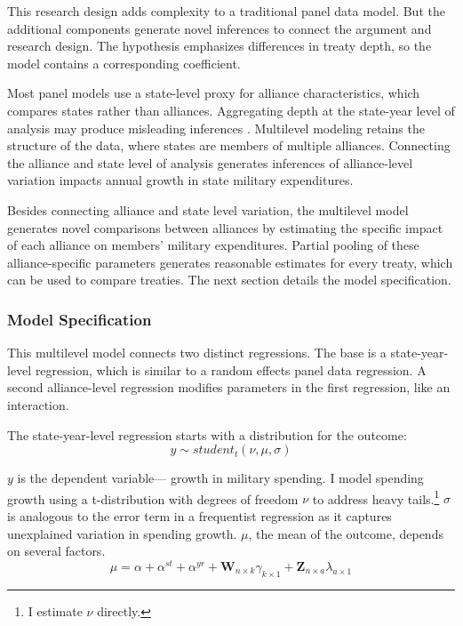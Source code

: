\documentclass[12pt]{article}
\begin{document}
This research design adds complexity to a traditional panel data model. 
But the additional components generate novel inferences to connect the argument and research design. 
The hypothesis emphasizes differences in treaty depth, so the model contains a corresponding coefficient.


Most panel models use a state-level proxy for alliance characteristics, which compares states rather than alliances.
Aggregating depth at the state-year level of analysis may produce misleading inferences \citep{McElreath2016}.
Multilevel modeling retains the structure of the data, where states are members of multiple alliances. 
Connecting the alliance and state level of analysis generates inferences of alliance-level variation impacts annual growth in state military expenditures. 


Besides connecting alliance and state level variation, the multilevel model generates novel comparisons between alliances by estimating the specific impact of each alliance on members' military expenditures. 
Partial pooling of these alliance-specific parameters generates reasonable estimates for every treaty, which can be used to compare treaties. 
The next section details the model specification. 
 


\subsubsection{Model Specification} 

This multilevel model connects two distinct regressions. 
The base is a state-year-level regression, which is similar to a random effects panel data regression.
A second alliance-level regression modifies parameters in the first regression, like an interaction. 


The state-year-level regression starts with a distribution for the outcome:
\begin{equation}
y \sim student_t(\nu, \mu, \sigma)
\end{equation}
 

$y$ is the dependent variable--- growth in military spending. 
I model spending growth using a t-distribution with degrees of freedom $\nu$ to address heavy tails.\footnote{I estimate $\nu$ directly.}
$\sigma$ is analogous to the error term in a frequentist regression as it captures unexplained variation in spending growth.  
$\mu$, the mean of the outcome, depends on several factors.
\begin{equation}
\mu = \alpha + \alpha^{st} + \alpha^{yr} +\textbf{W}_{n \times k} \gamma_{k \times 1}  + \textbf{Z}_{n \times a} \lambda_{a \times 1} 
\end{equation}
\end{document}
